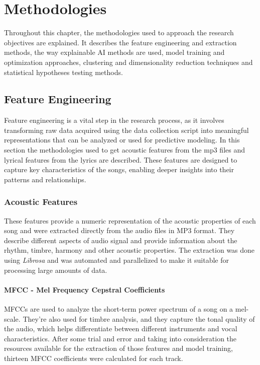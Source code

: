 \chapter{Methodologies}
\label{cha:methodologies}



Throughout this chapter, the methodologies used to approach the research
objectives are explained. It describes the feature engineering and extraction
methods, the way explainable AI methods are used, model training and
optimization approaches, clustering and dimensionality reduction techniques and
statistical hypotheses testing methods.

\section{Feature Engineering}
\label{sec:featureengineering}

Feature engineering is a vital step in the research process, as it involves
transforming raw data acquired using the data collection script into meaningful
representations that can be analyzed or used for predictive modeling. In this
section the methodologies used to get acoustic features from the mp3 files and
lyrical features from the lyrics are described. These features are designed to
capture key characteristics of the songs, enabling deeper insights into their
patterns and relationships.


\subsection{Acoustic Features}
\label{sec:acousticfeatures}

These features provide a numeric representation of the acoustic properties of
each song and were extracted directly from the audio files in MP3 format. They
describe different aspects of audio signal and provide information about the
rhythm, timbre, harmony and other acoustic properties. The extraction was done
using \textit{Librosa} and was automated and parallelized to make it suitable
for processing large amounts of data. \cite{librosa}


\subsubsection*{MFCC - Mel Frequency Cepstral Coefficients}
MFCCs are used to analyze the short-term power spectrum of a song on a
mel-scale. They're also used for timbre analysis, and they capture the tonal
quality of the audio, which helps differentiate between different instruments
and vocal characteristics. After some trial and error and taking into
consideration the resources available for the extraction of those features and
model training, thirteen MFCC coefficients were calculated for each track.




